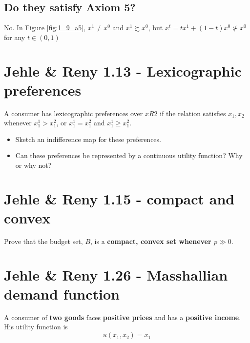 \documentclass{article}
\begin{document}
\subsection{Do they satisfy Axiom 5?}

No. In Figure \ref{fig:1_9_a5}, $x^1 \ne x^0$ and $x^1 \succsim x^0$, but
$x^t=tx^1+(1-t)x^0 \nsucc x^0$ for any $t \in (0,1)$


{\centering
{}
\label{fig:1_9_a5}}


\section{Jehle \& Reny 1.13 - Lexicographic preferences}
A consumer has lexicographic preferences over $x R2$ if the relation  satisfies $x_1, x_2$ whenever
$x_1^1 > x_1^2$, or $x_1^1 = x_1^2$ and $x_1^1 \ge x_1^2$.

\begin{itemize}
\item Sketch an indifference map for these preferences.
\item Can these preferences be represented by a continuous utility function? Why or why not?
\end{itemize}

\section{Jehle \& Reny 1.15 - compact and convex}
Prove that the budget set, $B$, is a \textbf{compact, convex set whenever $p \gg 0$}.

\section{Jehle \& Reny 1.26 - Masshallian demand function}
A consumer of \textbf{two goods} faces \textbf{positive prices} and has a \textbf{positive income}. 
His utility function is $$u(x_1, x_2) = x_1$$ 
\end{document}
